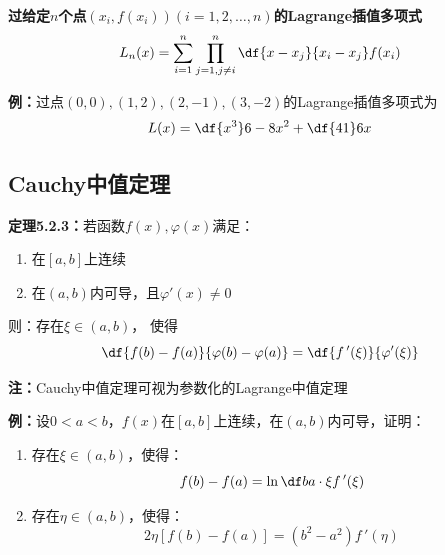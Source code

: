 \begin{shaded}
{\bf 过给定$n$个点$(x_i,f(x_i))(i=1,2,\ldots,n)$的Lagrange插值多项式}
$$L_n(x)=\sum\limits_{i=1}^n\prod_{j=1,j\ne i}^{n}
\df{x-x_j}{x_i-x_j}f(x_i)$$

{\bf 例：}过点$(0,0),(1,2),(2,-1),(3,-2)$的Lagrange插值多项式为
$$L(x)=\df{x^3}6-8x^2+\df{41}6x$$

\begin{center}
\end{center}


\end{shaded}

\subsection{Cauchy中值定理}

{\bf 定理5.2.3：}若函数$f(x),\varphi(x)$满足： 
\begin{enumerate}[(1)]
  \setlength{\itemindent}{1cm}
  \item 在$[a,b]$上连续 
  \item 在$(a,b)$内可导，且$\varphi'(x)\ne 0$ 
\end{enumerate}
则：存在$\xi\in(a,b)$， 使得
$$\df{f(b)-f(a)}{\varphi(b)-\varphi(a)}=\df{f\,'(\xi)}{\varphi'(\xi)}$$

{\bf 注：}Cauchy中值定理可视为参数化的Lagrange中值定理

{\bf 例：}设$0<a<b$，$f(x)$在$[a,b]$上连续，在$(a,b)$内可导，证明：
\begin{enumerate}[(1)]
  \setlength{\itemindent}{1cm}
  \item 存在$\xi\in(a,b)$，使得：
	$$f(b)-f(a)=\ln\df ba\cdot \xi f\,'(\xi)$$
  \item 存在$\eta\in(a,b)$，使得：
    $$2\eta[f(b)-f(a)]=(b^2-a^2)f\,'(\eta)$$
\end{enumerate}

